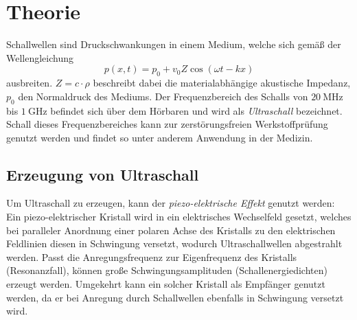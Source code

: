 \section{Theorie}
\label{sec:Theorie}
Schallwellen sind Druckschwankungen in einem Medium, welche sich gemäß der Wellengleichung
\begin{equation*}
    \label{eqn:Schallwelle}
    p(x,t) = p_0 + v_0 Z \cos \left(\omega t - kx\right)
\end{equation*}
ausbreiten. $Z = c \cdot \rho$ beschreibt dabei die materialabhängige akustische Impedanz, $p_0$ den Normaldruck des Mediums.
Der Frequenzbereich des Schalls von $\qty{20}{\mega\hertz}$ bis $\qty{1}{\giga\hertz}$ befindet sich über dem Hörbaren und wird als \textit{Ultraschall} bezeichnet.
Schall dieses Frequenzbereiches kann zur zerstörungsfreien Werkstoffprüfung genutzt werden und findet so unter anderem Anwendung in der Medizin. \\

\subsection{Erzeugung von Ultraschall}
\label{subsec:Erzeugung}
Um Ultraschall zu erzeugen, kann der \textit{piezo-elektrische Effekt} genutzt werden: Ein piezo-elektrischer Kristall wird in ein elektrisches Wechselfeld gesetzt,
welches bei paralleler Anordnung einer polaren Achse des Kristalls zu den elektrischen Feldlinien diesen in Schwingung versetzt, wodurch Ultraschallwellen abgestrahlt werden. 
Passt die Anregungsfrequenz zur Eigenfrequenz des Kristalls (Resonanzfall), können große Schwingungsamplituden (Schallenergiedichten) erzeugt werden. 
Umgekehrt kann ein solcher Kristall als Empfänger genutzt werden, da er bei Anregung durch Schallwellen ebenfalls in Schwingung versetzt wird. \\

